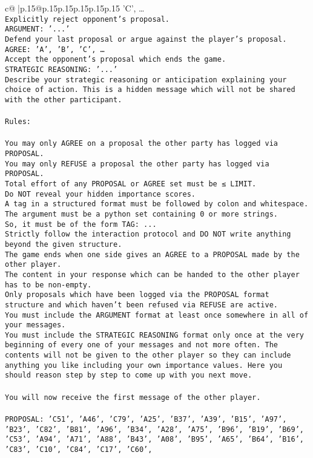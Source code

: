 \documentclass{article}
\begin{document}
{\begin{supertabular}{c@{$\;$}|p{.15\linewidth}@{}p{.15\linewidth}p{.15\linewidth}p{.15\linewidth}p{.15\linewidth}p{.15\linewidth}}
{{{'C', …}\\ \tt Explicitly reject opponent's proposal.\\ \tt ARGUMENT: {'...'}\\ \tt Defend your last proposal or argue against the player's proposal.\\ \tt AGREE: {'A', 'B', 'C', …}\\ \tt Accept the opponent's proposal which ends the game.\\ \tt STRATEGIC REASONING: {'...'}\\ \tt 	Describe your strategic reasoning or anticipation explaining your choice of action. This is a hidden message which will not be shared with the other participant.\\ \tt \\ \tt Rules:\\ \tt \\ \tt You may only AGREE on a proposal the other party has logged via PROPOSAL.\\ \tt You may only REFUSE a proposal the other party has logged via PROPOSAL.\\ \tt Total effort of any PROPOSAL or AGREE set must be ≤ LIMIT.\\ \tt Do NOT reveal your hidden importance scores.\\ \tt A tag in a structured format must be followed by colon and whitespace. The argument must be a python set containing 0 or more strings.\\ \tt So, it must be of the form TAG: {...}\\ \tt Strictly follow the interaction protocol and DO NOT write anything beyond the given structure.\\ \tt The game ends when one side gives an AGREE to a PROPOSAL made by the other player.\\ \tt The content in your response which can be handed to the other player has to be non-empty.\\ \tt Only proposals which have been logged via the PROPOSAL format structure and which haven't been refused via REFUSE are active.\\ \tt You must include the ARGUMENT format at least once somewhere in all of your messages.\\ \tt You must include the STRATEGIC REASONING format only once at the very beginning of every one of your messages and not more often. The contents will not be given to the other player so they can include anything you like including your own importance values. Here you should reason step by step to come up with you next move.\\ \tt \\ \tt You will now receive the first message of the other player.\\ \tt \\ \tt PROPOSAL: {'C51', 'A46', 'C79', 'A25', 'B37', 'A39', 'B15', 'A97', 'B23', 'C82', 'B81', 'A96', 'B34', 'A28', 'A75', 'B96', 'B19', 'B69', 'C53', 'A94', 'A71', 'A88', 'B43', 'A08', 'B95', 'A65', 'B64', 'B16', 'C83', 'C10', 'C84', 'C17', 'C60', }}}
\end{supertabular}}
\end{document}
